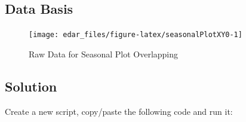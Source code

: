 \documentclass[
  a4paperpaper,
]{book}
\begin{document}
\hypertarget{data-basis}{%
\subsection{Data Basis}\label{data-basis}}

\begin{figure}
\texttt{[image: edar\_files/figure-latex/seasonalPlotXY0-1]} \caption{Raw Data for Seasonal Plot Overlapping}\label{fig:seasonalPlotXY0}
\end{figure}

\newpage

\hypertarget{solution}{%
\subsection{Solution}\label{solution}}

Create a new script, copy/paste the following code and run it:
\end{document}
